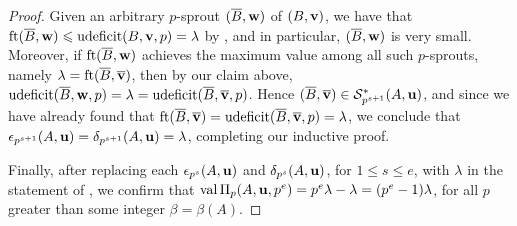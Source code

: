 \documentclass[11pt]{amsart}
\newcommand{\ushort}{\operatorname{ushort}}
\newcommand{\udeficit}{\operatorname{udeficit}}
\renewcommand{\S}{\mathcal{S}}
\begin{document}
\begin{proof}
Given an arbitrary $p$-sprout $(\overline{B}, \mathbf{w})$ of $(B, \mathbf{v})$, we have that  
$\ft{\overline{B}}{\vv{w}} \leq 
\udeficit(B, \vv{v}, p) = \lambda$ by ,  and in particular, $(\overline{B}, \mathbf{w})$ is very small.   
Moreover, if $\operatorname{ft}(\overline{B}, \mathbf{w})$ achieves the maximum value among all such $p$-sprouts, namely $\lambda = \operatorname{ft}(\overline{B}, \overline{\mathbf{v}})$, then by our claim above,  $\udeficit(\overline{B},\vv{w},p) = \lambda = \udeficit(\overline{B}, \overline{\vv{v}}, p)$. 
Hence $(\overline{B}, \overline{\vv{v}}) \in \S_{p^{s+1}}^\ast(A, \vv{u})$,
and since we have already found that $\ft{\overline{B}}{\overline{\vv{v}}} = \udeficit(\overline{B}, \overline{\vv{v}}, p)= \lambda$, 
 we conclude that
 $\epsilon_{p^{s+1}}(A,\mathbf{u})  =  \delta_{p^{s+1}}(A,\mathbf{u}) = \lambda$, completing our inductive proof. 


Finally, after replacing each $\epsilon_{p^s}(A,\mathbf{u})$ and $\delta_{p^s}(A,\mathbf{u})$, for  $1 \leq s \leq e$, with $\lambda$ in the statement of 
, we confirm that $\operatorname{val} \Pi_p(A, \mathbf{u}, p^e) = p^e \lambda - \lambda = (p^e-1)\lambda$, for all $p$ greater than some integer $\beta = \beta(A)$.
% 
% 
% 
\end{proof}
\end{document}
